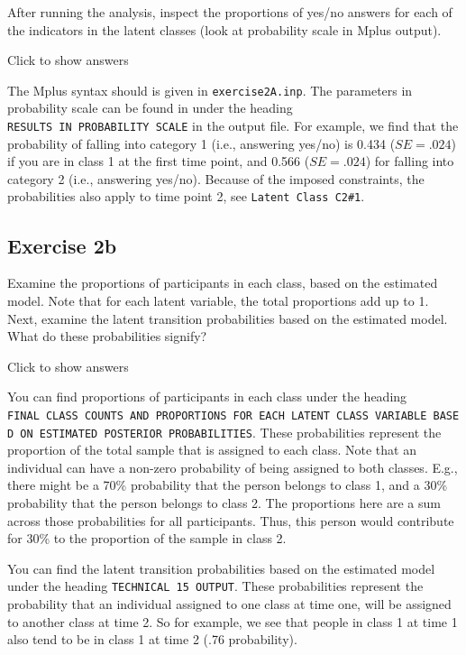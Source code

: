 \documentclass[
]{book}
\begin{document}
After running the analysis, inspect the proportions of yes/no answers for each of the indicators in the latent classes (look at probability scale in Mplus output).

Click to show answers

The Mplus syntax should is given in \texttt{exercise2A.inp}. The parameters in probability scale can be found in under the heading \texttt{RESULTS\ IN\ PROBABILITY\ SCALE} in the output file. For example, we find that the probability of falling into category 1 (i.e., answering yes/no) is 0.434 (\(SE = .024\)) if you are in class 1 at the first time point, and 0.566 (\(SE = .024\)) for falling into category 2 (i.e., answering yes/no). Because of the imposed constraints, the probabilities also apply to time point 2, see \texttt{Latent\ Class\ C2\#1}.

\hypertarget{exercise-2b}{%
\subsection{Exercise 2b}\label{exercise-2b}}

Examine the proportions of participants in each class, based on the estimated model. Note that for each latent variable, the total proportions add up to 1. Next, examine the latent transition probabilities based on the estimated model. What do these probabilities signify?

Click to show answers

You can find proportions of participants in each class under the heading \texttt{FINAL\ CLASS\ COUNTS\ AND\ PROPORTIONS\ FOR\ EACH\ LATENT\ CLASS\ VARIABLE\ BASED\ ON\ ESTIMATED\ POSTERIOR\ PROBABILITIES}. These probabilities represent the proportion of the total sample that is assigned to each class. Note that an individual can have a non-zero probability of being assigned to both classes. E.g., there might be a 70\% probability that the person belongs to class 1, and a 30\% probability that the person belongs to class 2. The proportions here are a sum across those probabilities for all participants. Thus, this person would contribute for 30\% to the proportion of the sample in class 2.

You can find the latent transition probabilities based on the estimated model under the heading \texttt{TECHNICAL\ 15\ OUTPUT}. These probabilities represent the probability that an individual assigned to one class at time one, will be assigned to another class at time 2. So for example, we see that people in class 1 at time 1 also tend to be in class 1 at time 2 (.76 probability).
\end{document}
